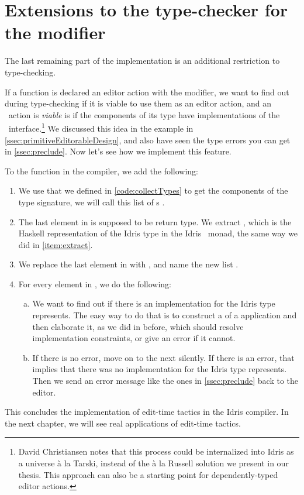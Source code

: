 \section{Extensions to the type-checker for the  modifier}\label{sec:extCheck}

The last remaining part of the implementation is an additional restriction to
type-checking.

If a function is declared an editor action with the  modifier, we
want to find out during type-checking if it is viable to use them as an editor
action, and an \Elab\ action is \emph{viable} is if the components of its type have
implementations of the \Editorable\ interface.\footnote{
  David Christiansen notes that this process could be internalized into Idris
  as a universe \`a la Tarski, instead of the \`a la Russell solution we
  present in our thesis. This approach can also be a starting point for
  dependently-typed editor actions.} We discussed this idea in the 
example in \autoref{ssec:primitiveEditorableDesign}, and also have seen the
type errors you can get in \autoref{ssec:preclude}. Now let's see how we
implement this feature.

To the  function in the compiler, we add the following:
\begin{enumerate}
  \item We use  that we defined in \autoref{code:collectTypes} to get the components of the type signature, we will call this list of s .
  \item The last element in  is supposed to be return type. We
    extract , which is the Haskell representation of the Idris
    type in the Idris \Elab\ monad, the same way we did in
    \autoref{item:extract}.
  \item We replace the last element in  with ,
    and name the new list .
  \item For every element  in , we do the following:
    \begin{enumerate}[(a)]
      \item We want to find out if there is an  implementation
        for the Idris type  represents. The easy way to do that is to
        construct a  of a  application and then
        elaborate it, as we did in \label{item:fromEditor} before, which should
        resolve implementation constraints, or give an error if it cannot.
      \item If there is no error, move on to the next  silently.
        If there is an error, that implies that there was no 
        implementation for the Idris type  represents. Then we send an
        error message like the ones in \autoref{ssec:preclude} back to the editor.
    \end{enumerate}
\end{enumerate}

This concludes the implementation of edit-time tactics in the Idris compiler.
In the next chapter, we will see real applications of edit-time tactics.
